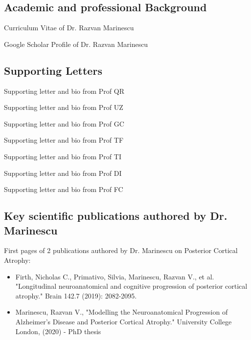 \documentclass[11pt]{article}
\begin{document}
\begin{thebibliography}{9}

\subsection*{Academic and professional Background}

Curriculum Vitae of Dr. Razvan Marinescu


Google Scholar Profile of Dr. Razvan Marinescu 


\subsection*{Supporting Letters}

Supporting letter and bio from Prof QR

Supporting letter and bio from Prof UZ

Supporting letter and bio from Prof GC

Supporting letter and bio from Prof TF

Supporting letter and bio from Prof TI

Supporting letter and bio from Prof DI

Supporting letter and bio from Prof FC

\subsection*{Key scientific publications authored by Dr. Marinescu}



First pages of 2 publications authored by Dr. Marinescu on Posterior Cortical Atrophy:
\begin{itemize}
 \item Firth, Nicholas C., Primativo, Silvia, Marinescu, Razvan V., et al. "Longitudinal neuroanatomical and cognitive progression of posterior cortical atrophy." Brain 142.7 (2019): 2082-2095.
 \item Marinescu, Razvan V., "Modelling the Neuroanatomical Progression of Alzheimer's Disease and Posterior Cortical Atrophy." University College London, (2020) - PhD thesis
\end{itemize}





\end{thebibliography}
\end{document}
